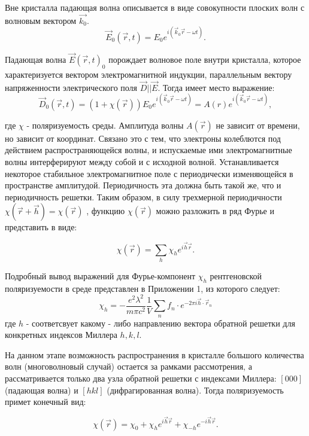 
Вне кристалла падающая волна описывается в виде совокупности плоских волн с волновым вектором  $\vec{k_0}$.
\begin{equation}
  \vec{E}_0(\vec{r},t) = E_0 e^{i(\vec{k}_0\vec{r}-\omega t)}.
 \end{equation}

Падающая волна $\vec{E}(\vec{r},t)_0$ порождает волновое поле внутри кристалла, которое характеризуется вектором
электромагнитной индукции, параллельным вектору напряженности электрического поля $\vec{D}||\vec{E}$. Тогда
имеет место выражение:
\begin{equation}
 \vec{D}_0(\vec{r},t) = (1+\chi(\vec{r})) E_0 e^{i(\vec{k}_0\vec{r}-\omega t)} = A(r) e^{i(\vec{k}_0\vec{r}-\omega t)},
\end{equation}
 \noindent

где $\chi$ - поляризуемость среды. Амплитуда волны $A(\vec{r})$ не зависит
от времени, но зависит от координат. Связано это с тем, что электроны колеблются
под действием распространяющейся волны, и испускаемые ими электромагнитные волны
интерферируют между собой и с исходной волной. Устанавливается некоторое стабильное
электромагнитное поле с периодически изменяющейся в пространстве амплитудой. Периодичность эта должна быть
такой же, что и периодичность решетки. Таким образом, в силу трехмерной периодичности $\chi(\vec{r}+\vec{h}) = \chi(\vec{r})$
, функцию $\chi(\vec{r})$ можно разложить в ряд Фурье и представить в виде:

\begin{equation}
\chi(\vec{r}) = \sum_{h}\chi_h e^{i\vec{h}\vec{r}}.
\end{equation}

Подробный вывод выражений для Фурье-компонент $\chi_h$ рентгеновской поляризуемости
 в среде представлен в Приложении 1, из которого следует:
\begin{equation}
\chi_h = -\frac{e^2 \lambda^2}{m \pi c^2} \frac{1}{V} \sum_{n} f_n \cdot e^{-2\pi i\vec{h}\cdot \vec{r}_n}
\end{equation}
\noindent
где $h$ - соответсвует какому - либо направлению вектора обратной решетки для конкретных индексов Миллера $h, k, l$.

На данном этапе возможность распространения в кристалле большого количества
волн (многоволновый случай) остается за рамками рассмотрения, а
рассматривается только два узла обратной решетки с индексами Миллера:
$[000]$ (падающая волна) и $[hkl]$ (дифрагированная волна).
Тогда поляризуемость примет конечный вид:

\begin{equation}
\chi(\vec{r}) = \chi_0 + \chi_h e^{i\vec{h}\vec{r}} + \chi_{-h} e^{-i\vec{h}\vec{r}}.
\end{equation}

